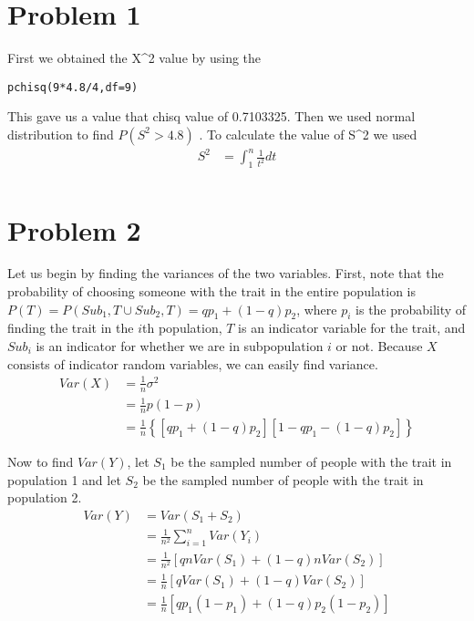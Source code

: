 \documentclass{article}
\begin{document}
\thispagestyle{fancy}

\section*{Problem 1}
First we obtained the X^2 value by using the
\begin{verbatim}
pchisq(9*4.8/4,df=9)
\end{verbatim}
This gave us a value that chisq value of 0.7103325. Then we used normal distribution to find $P( S^2 > 4.8 )$ . To calculate the value of S^2 we used
\begin{align*}
  S^2 &= \int_{1}^{n} \frac{1}{t^2} dt \\
\end{align*}

\section*{Problem 2}

Let us begin by finding the variances of the two variables. First, note that
the probability of choosing someone with the trait in the entire population is
$P(T) = P(Sub_1,T\cup Sub_2,T) = qp_1 + ( 1 - q )p_2$, where $p_i$ is the
probability of finding the trait in the $i$th population, $T$ is an indicator
variable for the trait, and $Sub_i$ is an indicator for whether we are in
subpopulation $i$ or not. Because $X$ consists of indicator random variables,
we can easily find variance.
\begin{align*}
  Var(X) &= \frac{1}{n}\sigma^2 \\
         &= \frac{1}{n}p(1-p) \\
         &= \frac{1}{n}\left\{[qp_1 + (1-q)p_2][1 - qp_1 - (1-q)p_2]\right\}
\end{align*}

Now to find $Var(Y)$, let $S_1$ be the sampled number of people with the trait
in population 1 and let $S_2$ be the sampled number of people with the trait in
population 2.
\begin{align*}
  Var(Y) &= Var(S_1 + S_2) \\
         &= \frac{1}{n^2}\sum\limits_{i = 1}^{n} Var( Y_i ) \\
         &= \frac{1}{n^2}\left[qnVar( S_1 ) + (1-q)nVar( S_2 ) \right] \\
         &= \frac{1}{n} [qVar( S_1 ) + (1-q)Var(S_2)] \\
         &= \frac{1}{n} [qp_1(1-p_1) + (1-q)p_2(1-p_2)]
\end{align*}
\end{document}
